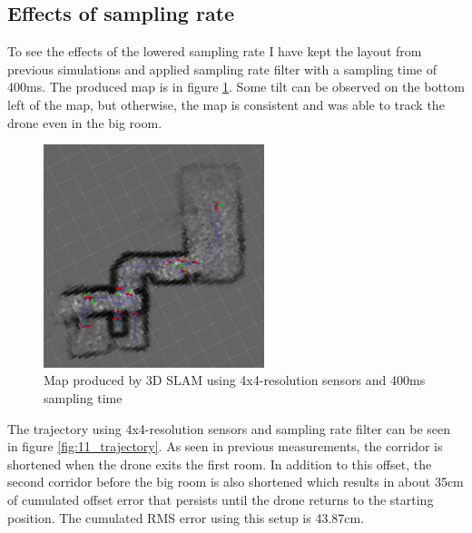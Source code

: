\newpage


\subsection{Effects of sampling rate}
To see the effects of the lowered sampling rate I have kept the layout from previous simulations and
applied sampling rate filter with a sampling time of 400ms. The produced map is in figure \ref{fig:11_map}.
Some tilt can be observed on the bottom left of the map, but otherwise, the map is consistent and was able to
track the drone even in the big room.

\begin{figure}[!h]
    \centering
    \includegraphics[height=65mm, keepaspectratio]{figures/11_map.png}
    \caption{Map produced by 3D SLAM using 4x4-resolution sensors and 400ms sampling time}
    \label{fig:11_map}
\end{figure}

The trajectory using 4x4-resolution sensors and sampling rate filter can be seen in figure \ref{fig:11_trajectory}.
As seen in previous measurements, the corridor is shortened when the drone exits the first room.
In addition to this offset, the second corridor before the big room is also shortened which results
in about 35cm of cumulated offset error that persists until the drone returns to the starting position.
The cumulated RMS error using this setup is 43.87cm.


